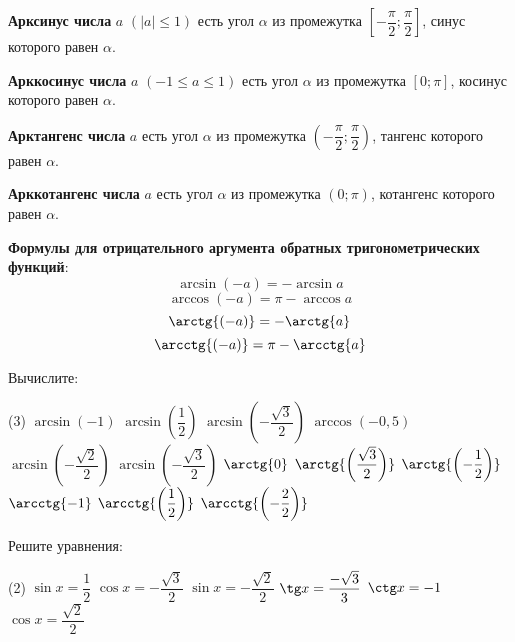 \begin{class}[number=3]
	\begin{definit}
		\textbf{Арксинус числа} \(a \) \((|a| \le 1) \) есть угол \( \alpha \) из промежутка \(\left[ -\dfrac{\pi}{2};\dfrac{\pi}{2} \right]\), синус которого равен \( \alpha \).%
	\end{definit}
	\begin{definit}
		\textbf{Арккосинус числа} \(a \) \((-1\le a \le 1) \) есть угол \( \alpha \) из промежутка \([0; \pi]\), косинус которого равен \( \alpha \).%
	\end{definit}
	\begin{definit}
		\textbf{Арктангенс числа} \(a \) есть угол \( \alpha \) из промежутка \(\left( -\dfrac{\pi}{2};\dfrac{\pi}{2} \right)\), тангенс которого равен \( \alpha \).%
	\end{definit}
	\begin{definit}
		\textbf{Арккотангенс числа} \(a \) есть угол \( \alpha \) из промежутка \((0; \pi)\), котангенс которого равен \( \alpha \).%
	\end{definit}
	\textbf{Формулы для отрицательного аргумента обратных тригонометрических функций}:
	\[ \arcsin{(-a)}=-\arcsin{a} \]
	\[ \arccos{(-a)}=\pi-\arccos{a} \]
	\[ \arctg{(-a)}=-\arctg{a} \]
	\[ \arcctg{(-a)}=\pi-\arcctg{a} \]
	\begin{listofex}
		\item Вычислите:
		\begin{tasks}(3)
			\task \( \arcsin{(-1)} \)
			\task \( \arcsin{\left( \dfrac{1}{2} \right)} \)
			\task \( \arcsin{\left( -\dfrac{\sqrt{3}}{2} \right)} \)
			\task \( \arccos{(-0,5)} \)
			\task \( \arcsin{\left( -\dfrac{\sqrt{2}}{2} \right)} \)
			\task \( \arcsin{\left( -\dfrac{\sqrt{3}}{2} \right)} \)
			\task \( \arctg{0} \)
			\task \( \arctg{\left( \dfrac{\sqrt{3}}{2} \right)} \)
			\task \( \arctg{\left( -\dfrac{1}{2} \right)} \)
			\task \( \arcctg{-1} \)
			\task \( \arcctg{\left( \dfrac{1}{2} \right)} \)
			\task \( \arcctg{\left( -\dfrac{2}{2} \right)} \)
		\end{tasks}
		\newpage
		\item Решите уравнения:
		\begin{tasks}(2)
			\task \( \sin x=\dfrac{1}{2} \)
			\task \( \cos x=-\dfrac{\sqrt{3}}{2} \)
			\task \( \sin x = -\dfrac{\sqrt{2}}{2} \)
			\task \( \tg x = \dfrac{-\sqrt{3}}{3} \)
			\task \( \ctg x = -1 \)
			\task \( \cos x = \dfrac{\sqrt{2}}{2} \)

\end{tasks}
\end{listofex}
\end{class}
